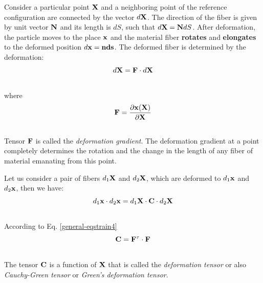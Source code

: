 \documentclass[letterpaper,10pt,english]{sphinxmanual}
\begin{document}
Consider a particular point ${\bf X}$ and a neighboring point of the reference configuration are connected by the vector $d \bf X$. The direction of the fiber is given by unit vector ${\bf N}$ and its length is $dS$, such that $d{\bf X}={\bf N}dS$. After deformation, the particle moves to the place ${\bf x}$ and the material fiber \textbf{rotates} and \textbf{elongates} to the deformed position $d \bf x={\bf n}ds$. The deformed fiber is determined by the deformation:
\label{general:equation-eqstrain3}\begin{gather}
\begin{split}d{\bf X} = {\bf F} \cdot d{\bf X}\end{split}\label{general-eqstrain3}\\\begin{split}\end{split}\notag
\end{gather}
where
\label{general:equation-eqstrain4}\begin{gather}
\begin{split}{\bf F} = \frac{\partial {\bf x(X)}}{\partial \bf X}\end{split}\label{general-eqstrain4}\\\begin{split}\end{split}\notag
\end{gather}
Tensor ${\bf F}$ is called the \emph{deformation gradient}. The deformation gradient at a point completely determines the rotation and the change in the length of any fiber of material emanating from this point.

Let us consider a pair of fibers $d_1 {\bf X}$ and $d_2 {\bf X}$, which are deformed to $d_1 {\bf x}$ and $d_2 {\bf x}$, then we have:
\label{general:equation-eqstrain5}\begin{gather}
\begin{split}d_1{\bf x} \cdot d_2{\bf x} = d_1{\bf X} \cdot {\bf C} \cdot d_2{\bf X}\end{split}\label{general-eqstrain5}\\\begin{split}\end{split}\notag
\end{gather}
According to Eq. \eqref{general-eqstrain4}
\label{general:equation-eqstrain6}\begin{gather}
\begin{split}{\bf C} = {\bf F}^\tau \cdot {\bf F}\end{split}\label{general-eqstrain6}\\\begin{split}\end{split}\notag
\end{gather}
The tensor ${\bf C}$ is a function of ${\bf X}$ that is called the \emph{deformation tensor} or also \emph{Cauchy-Green tensor} or \emph{Green's deformation tensor}.
\end{document}
